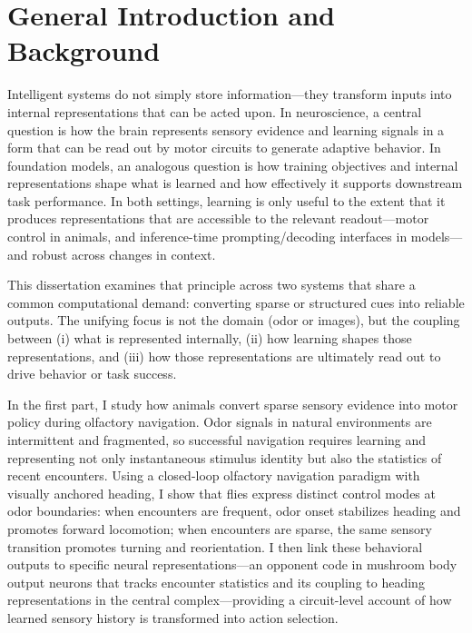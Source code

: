 

\chapter{General Introduction and Background}

Intelligent systems do not simply store information—they transform inputs into internal representations that can be acted upon. In neuroscience, a central question is how the brain represents sensory evidence and learning signals in a form that can be read out by motor circuits to generate adaptive behavior. In foundation models, an analogous question is how training objectives and internal representations shape what is learned and how effectively it supports downstream task performance. In both settings, learning is only useful to the extent that it produces representations that are accessible to the relevant readout—motor control in animals, and inference-time prompting/decoding interfaces in models—and robust across changes in context.

This dissertation examines that principle across two systems that share a common computational demand: converting sparse or structured cues into reliable outputs. The unifying focus is not the domain (odor or images), but the coupling between (i) what is represented internally, (ii) how learning shapes those representations, and (iii) how those representations are ultimately read out to drive behavior or task success.

In the first part, I study how animals convert sparse sensory evidence into motor policy during olfactory navigation. Odor signals in natural environments are intermittent and fragmented, so successful navigation requires learning and representing not only instantaneous stimulus identity but also the statistics of recent encounters. Using a closed-loop olfactory navigation paradigm with visually anchored heading, I show that flies express distinct control modes at odor boundaries: when encounters are frequent, odor onset stabilizes heading and promotes forward locomotion; when encounters are sparse, the same sensory transition promotes turning and reorientation. I then link these behavioral outputs to specific neural representations—an opponent code in mushroom body output neurons that tracks encounter statistics and its coupling to heading representations in the central complex—providing a circuit-level account of how learned sensory history is transformed into action selection.

